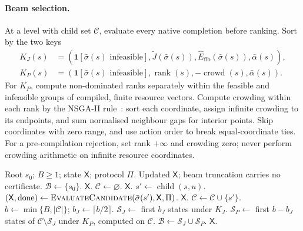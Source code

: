 \documentclass[a4paper,onecolumn,11pt,unpublished]{quantumarticle}
\theoremstyle{remark}
\begin{document}
\paragraph{Beam selection.}
At a level with child set $\mathcal C$, evaluate every native completion
before ranking.  Sort by the two keys
\begin{align}
K_J(s)&=(\mathbf1[\bar\sigma(s)\text{ infeasible}],
\widetilde J(\bar\sigma(s)),\widehat E_{\mathrm{fib}}(\bar\sigma(s)),\bar\alpha(s)),
\label{eq:app-beam-score-order}\\
K_P(s)&=(\mathbf1[\bar\sigma(s)\text{ infeasible}],
\operatorname{rank}(s),-\operatorname{crowd}(s),\bar\alpha(s)).
\label{eq:app-beam-pareto-order}
\end{align}
For $K_P$, compute non-dominated ranks separately within the feasible and
infeasible groups of compiled, finite resource vectors.  Compute crowding
within each rank by the NSGA-II rule~\cite{DebEtAl2002}: sort each coordinate,
assign infinite crowding to its endpoints, and sum normalised neighbour gaps
for interior points.  Skip coordinates with zero range, and use action order
to break equal-coordinate ties.  For a pre-compilation rejection, set rank
$+\infty$ and crowding zero; never perform crowding arithmetic on infinite
resource coordinates.

\begin{algorithm}[H]
\caption{Width-$B$ Pareto-beam search}
\label{alg:app-pareto-beam}
\begin{algorithmic}[1]
\Require Root $s_0$; $B\geq1$; state $\mathsf X$; protocol $\Pi$.
\Ensure Updated $\mathsf X$; beam truncation carries no certificate.
\State $\mathcal B\gets\{s_0\}$.
     \State \Return $\mathsf X$. \EndIf
    \State $\mathcal C\gets\varnothing$.
         \State \Return $\mathsf X$. \EndIf
        \State $s'\gets\operatorname{child}(s,u)$.
        \State $(\mathsf X,\mathrm{done})\gets
        \Call{EvaluateCandidate}{\bar\sigma(s'),\mathsf X,\Pi}$.
         \State \Return $\mathsf X$. \EndIf
        \State $\mathcal C\gets\mathcal C\cup\{s'\}$.
    \EndFor
    \State $b\gets\min\{B,|\mathcal C|\}$; $b_J\gets\lceil b/2\rceil$.
    \State $\mathcal S_J\gets$ first $b_J$ states under $K_J$.
    \State $\mathcal S_P\gets$ first $b-b_J$ states of
    $\mathcal C\setminus\mathcal S_J$ under $K_P$, computed on $\mathcal C$.
    \State $\mathcal B\gets\mathcal S_J\cup\mathcal S_P$.
\EndFor
\State \Return $\mathsf X$.
\end{algorithmic}
\end{algorithm}
\end{document}
